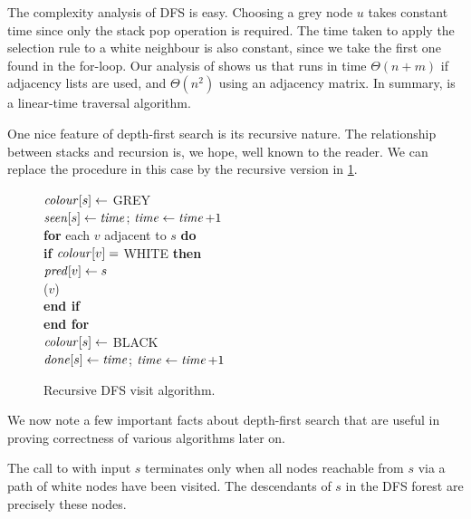 The complexity analysis of DFS is easy. Choosing a grey node $u$ takes
constant time since only the stack pop operation is required. The time
taken to apply the selection rule to a white neighbour is also constant,
since we take the first one found in the for-loop. Our analysis of
 shows us that  runs in time $\Theta(n+m)$
if adjacency lists are used, and $\Theta(n^2)$ using an adjacency matrix.
In summary,  is a linear-time traversal algorithm.

One nice feature of depth-first search is its recursive nature.  The
relationship between stacks and recursion is, we hope, well known to the
reader. We can replace the  procedure in this case by
the recursive version in \cref{fig:DFSreccode}.

\begin{figure}[htbp]
\hspace*{1.3in}\begin{minipage}{5in}
{
\> $\operatorname{\text{\textit{colour}}}[s] \gets $ GREY \\
\> $\operatorname{\text{\textit{seen}}}[s] \gets \operatorname{\text{\textit{time}}}$; $\operatorname{\text{\textit{time}}} \gets \operatorname{\text{\textit{time}}} + 1$ \\
\> \textbf{for} each $v$ adjacent to $s$ \textbf{do} \\
\> \> \textbf{if} $\operatorname{\text{\textit{colour}}}[v] = $ WHITE \textbf{then} \\
\> \> \> $\operatorname{\text{\textit{pred}}}[v] \gets s$ \\
\> \> \> ($v$) \\
\> \> \textbf{end if} \\
\> \textbf{end for} \\
\> $\operatorname{\text{\textit{colour}}}[s] \gets $ BLACK \\
\> $\operatorname{\text{\textit{done}}}[s] \gets \operatorname{\text{\textit{time}}} $; $\operatorname{\text{\textit{time}}} \gets \operatorname{\text{\textit{time}}} + 1$ \\
}
\end{minipage}
\caption{Recursive DFS visit algorithm.}
\label{fig:DFSreccode}
\end{figure}

We now note a few important facts about depth-first search that are
useful in proving correctness of various algorithms later on. 

\begin{Theorem} \label{thm:white-path} 
The call to 
with input $s$ terminates only when all nodes reachable from $s$ via
a path of white nodes have been visited. The descendants of $s$ in the
DFS forest are precisely these nodes.
\end{Theorem}

